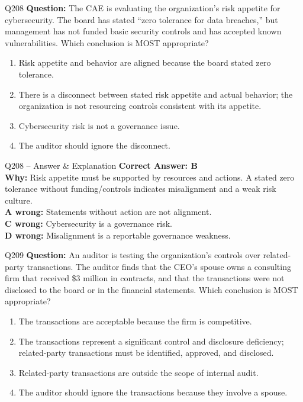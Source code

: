 \documentclass[aspectratio=169,10pt]{beamer}
\begin{document}
	\begin{frame}[t]{Q208}
		\small
		\textbf{Question:} The CAE is evaluating the organization's risk appetite for cybersecurity. The board has stated ``zero tolerance for data breaches,'' but management has not funded basic security controls and has accepted known vulnerabilities. Which conclusion is MOST appropriate?
		\begin{enumerate}[label=\Alph*.,itemsep=1pt,topsep=2pt]
			\item Risk appetite and behavior are aligned because the board stated zero tolerance.
			\item There is a disconnect between stated risk appetite and actual behavior; the organization is not resourcing controls consistent with its appetite.
			\item Cybersecurity risk is not a governance issue.
			\item The auditor should ignore the disconnect.
		\end{enumerate}
	\end{frame}
	
	\begin{frame}[t]{Q208 -- Answer \& Explanation}
		\small
		\textbf{Correct Answer: B} \\[4pt]
		\textbf{Why:} Risk appetite must be supported by resources and actions. A stated zero tolerance without funding/controls indicates misalignment and a weak risk culture. \\[4pt]
		\textbf{A wrong:} Statements without action are not alignment. \\[2pt]
		\textbf{C wrong:} Cybersecurity is a governance risk. \\[2pt]
		\textbf{D wrong:} Misalignment is a reportable governance weakness.
	\end{frame}
	
	\begin{frame}[t]{Q209}
		\small
		\textbf{Question:} An auditor is testing the organization's controls over related-party transactions. The auditor finds that the CEO's spouse owns a consulting firm that received \$3 million in contracts, and that the transactions were not disclosed to the board or in the financial statements. Which conclusion is MOST appropriate?
		\begin{enumerate}[label=\Alph*.,itemsep=1pt,topsep=2pt]
			\item The transactions are acceptable because the firm is competitive.
			\item The transactions represent a significant control and disclosure deficiency; related-party transactions must be identified, approved, and disclosed.
			\item Related-party transactions are outside the scope of internal audit.
			\item The auditor should ignore the transactions because they involve a spouse.
		\end{enumerate}
	\end{frame}
	
\end{document}
